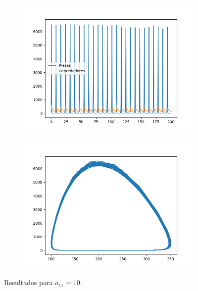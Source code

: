 \documentclass[11pt,a4paper]{article}
\begin{document}
\begin{figure}[H]
\centering
\begin{subfigure}{.5\textwidth}
	\centering
	\includegraphics[scale=0.45]{img/a11-10}
\end{subfigure}%
\begin{subfigure}{.5\textwidth}
	\centering
	\includegraphics[scale=0.45]{img/circulo-a11}
\end{subfigure}
\caption{Resultados para $a_{11} = 10$.}
\end{figure}
\end{document}

